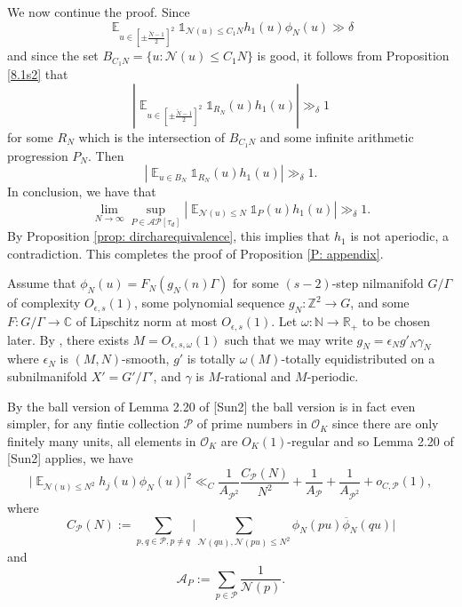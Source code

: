 \documentclass[11pt]{amsart}
\theoremstyle{definition}
\DeclareMathOperator*{\E}{\mathbb{E}}
\newcommand{\C}{{\mathbb C}}
\newcommand{\N}{{\mathbb N}}
\newcommand{\NN}{{\mathcal N}}
\newcommand{\R}{{\mathbb R}}
\newcommand{\Z}{{\mathbb Z}}
\newcommand{\e}{\epsilon}
\begin{document}
We now continue the proof. Since 
 $$\E_{u\in\left[\pm\frac{\tilde{N}-1}{2}\right]^{2}}\mathds{1}_{\NN(u)\leq C_1N}h_{1}(u)\phi_{N}(u)\gg \delta$$
 and since the set $B_{C_1N}=\{u\colon\NN(u)\leq C_1N\}$ is good, it follows from Proposition \ref{8.1s2} that 
 $$\left|\E_{u\in[\pm\frac{\tilde{N}-1}{2}]^{2}}\mathds{1}_{R_{N}}(u)h_{1}(u)\right|\gg_{\delta} 1$$
 for some $R_{N}$ which is the intersection of $B_{C_1N}$ and some infinite arithmetic progression $P_{N}$. Then 
  $$\left|\E_{u\in B_{N}}\mathds{1}_{R_{N}}(u)h_{1}(u)\right|\gg_{\delta} 1.$$
In conclusion, we have that 
$$\lim_{N\to\infty}\sup_{P\in\mathcal{AP}[\tau_{d}]}\left|\E_{\NN(u)\leq N}\mathds{1}_{P}(u)h_{1}(u)\right|\gg_{\delta} 1.$$
By Proposition \ref{prop: dircharequivalence}, this implies that $h_{1}$ is not aperiodic, a contradiction. This completes the proof of Proposition \ref{P: appendix}.


\iffalse

Assume that $\phi_{N}(u)=F_{N}(g_{N}(n)\Gamma)$ for some $(s-2)$-step nilmanifold $G/\Gamma$ of  complexity $O_{\e,s}(1)$, some polynomial sequence $g_{N}\colon\Z^{2}\to G$, and some $F\colon G/\Gamma\to\C$ of Lipschitz norm at most  $O_{\e,s}(1)$. Let $\omega\colon\N\to\R_{+}$ to be chosen later.
By \cite[Theorem~4.16]{S23}, there exists $M=O_{\e,s,\omega}(1)$ such that we may write 
$g_{N}=\e_{N}g'_{N}\gamma_{N}$ where $\e_{N}$ is $(M,N)$-smooth, $g'$ is totally $\omega(M)$-totally equidistributed on a subnilmanifold $X'=G'/\Gamma'$, and $\gamma$ is $M$-rational and $M$-periodic.




By the ball version of Lemma 2.20 of [Sun2] {\color{red} the ball version is in fact even simpler}, for any fintie collection $\mathcal{P}$ of prime numbers in $\mathcal{O}_{K}$ {\color{red} since there are only finitely many units, all elements in $\mathcal{O}_{K}$ are $O_{K}(1)$-regular and so  Lemma 2.20 of [Sun2] applies}, we have
$$\vert\E_{\NN(u)\leq N^{2}}h_{j}(u)\phi_{N}(u)\vert^{2}\ll_{C}\frac{1}{A_{\mathcal{P}^{2}}}\frac{C_{\mathcal{P}}(N)}{N^{2}}+\frac{1}{A_{\mathcal{P}}}+\frac{1}{A_{\mathcal{P}^{2}}}+o_{C,\mathcal{P}}(1),$$
where
$$C_{\mathcal{P}}(N):=\sum_{p,q\in\mathcal{P}, p\neq q}\vert\sum_{\NN(qu),\NN(pu)\leq N^{2}}\phi_{N}(pu)\overline{\phi}_{N}(qu)\vert$$
and 
$$\mathcal{A}_{P}:=\sum_{p\in\mathcal{P}}\frac{1}{\NN(p)}.$$
\end{document}
